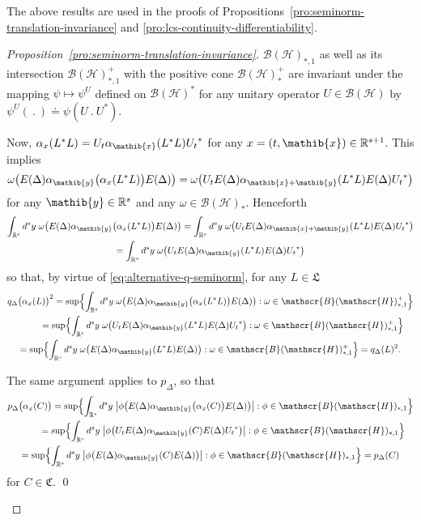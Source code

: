 \documentclass[a4paper,a4paper]{article}
\numberwithin{equation}{section}
\newcommand{\Cfrak}{\mathfrak{C}}
\newcommand{\Lfrak}{\mathfrak{L}}
\newcommand{\xib}{\mathib{x}}
\newcommand{\yib}{\mathib{y}}
\newcommand{\Rs}{\mathbb{R}^s}
\newcommand{\Rsone}{\mathbb{R}^{s + 1}}
\newcommand{\BH}{\mathscr{B} ( \mathscr{H} )}
\newcommand{\ED}{E ( \Delta )}
\newcommand{\aibx}{\alpha_\mathib{x}}
\newcommand{\aiby}{\alpha_\mathib{y}}
\newcommand{\ax}{\alpha_x}
\newcounter{proofitem}
\newenvironment{prooflist}{\begin{list}{(\roman{proofitem})}%
  {\usecounter{proofitem} \setlength{\topsep}{0ex}%
   \setlength{\parsep}{0.2ex} \setlength{\itemsep}{0.4ex}%
   \setlength{\leftmargin}{0em} \setlength{\itemindent}{0.5em}%
   \setlength{\listparindent}{1em}}}{\qed \end{list}}
\theoremstyle{definition}
\theoremstyle{plain}
\theoremstyle{remark}
\newcommand{\Bset}[1]{\Bigl\{ #1 \Bigr\}}
\newcommand{\babs}[1]{\bigl\lvert #1 \bigr\rvert}
\newcommand{\pD}{p_\Delta}
\newcommand{\pDx}[1]{p_\Delta ( #1 )}
\newcommand{\bpDx}[1]{p_\Delta \bigl( #1 \bigr)}
\newcommand{\qDx}[1]{q_\Delta ( #1 )}
\newcommand{\bqDx}[1]{q_\Delta \bigl( #1 \bigr)}
\begin{document}
  The above results are used in the proofs of
  Propositions~\ref{pro:seminorm-translation-invariance} and
  \ref{pro:lcs-continuity-differentiability}.
  \begin{proof}[Proposition~\ref{pro:seminorm-translation-invariance}]
    $\BH_{*,1}$ as well as its intersection $\BH^+_{*,1}$ with the
    positive cone $\BH^+_*$ are invariant under the mapping $\psi
    \mapsto \psi^U$ defined on $\BH^*$ for any unitary operator $U \in
    \BH$ by $\psi^U (~.~) \doteq \psi ( U~.~U^* )$.
    \begin{prooflist}
    \item Now, $\ax ( L^* L ) = U_t \aibx ( L^* L ) {U_t}^*$ for any
      $x = ( t , \xib ) \in \Rsone$. This implies
      \begin{equation*}
        \omega \bigl( \ED \aiby \bigl( \ax ( L^* L ) \bigr) \ED \bigr)
        = \omega \bigl( U_t \ED \alpha_{\xib + \yib} ( L^* L ) \ED
        {U_t}^* \bigr)
      \end{equation*}
      for any $\yib \in \Rs$ and any $\omega \in \BH_*$. Henceforth
      \begin{multline*}
        \int_{\Rs} d^s y \; \omega \bigl( \ED \aiby \bigl(
        \ax ( L^* L ) \bigr) \ED \bigr) = \int_{\Rs} d^s y \; \omega
        \bigl( U_t \ED \alpha_{\xib + \yib} ( L^* L ) \ED {U_t}^*
        \bigr) \\ 
        = \int_{\Rs} d^s y \; \omega \bigl( U_t \ED \aiby ( L^*
        L ) \ED {U_t}^* \bigr)
      \end{multline*}
      so that, by virtue of \eqref{eq:alternative-q-seminorm}, for any
      $L \in \Lfrak$
      \begin{multline*}
        \bqDx{\ax ( L )}^2 = \sup \Bset{\int_{\Rs} d^s y \; \omega
          \bigl( \ED \aiby \bigl( \ax ( L^* L ) \bigr) \ED \bigr) :
          \omega \in \BH^+_{*,1}} \\
        \mspace{50mu} = \sup \Bset{\int_{\Rs} d^s y \; \omega \bigl( U_t
          \ED \aiby ( L^* L ) \ED {U_t}^* \bigr) : \omega \in
          \BH^+_{*,1}} \\
        = \sup \Bset{\int_{\Rs} d^s y \; \omega \bigl( \ED \aiby (
          L^* L ) \ED \bigr) : \omega \in \BH^+_{*,1}} = \qDx{L}^2
        \text{.}
      \end{multline*}
    \item The same argument applies to $\pD$, so that
      \begin{multline*}
        \bpDx{\ax ( C )} = \sup \Bset{\int_{\Rs} d^s y \; \babs{\phi
        \bigl( \ED \aiby \bigl( \ax ( C ) \bigr) \ED \bigr)} :
        \phi \in \BH_{*,1}} \\
        \mspace{50mu} = \sup \Bset{\int_{\Rs} d^s y \; \babs{\phi
        \bigl( U_t \ED \aiby ( C ) \ED {U_t}^* \bigr)} : \phi
        \in \BH_{*,1}} \\
        = \sup \Bset{\int_{\Rs} d^s y \; \babs{\phi \bigl( \ED
        \aiby ( C ) \ED \bigr)} : \phi \in \BH_{*,1}} = \pDx{C}
      \end{multline*}
    for $C \in \Cfrak$. 
    \end{prooflist}
    \renewcommand{\qed}{}
  \end{proof}
\end{document}
